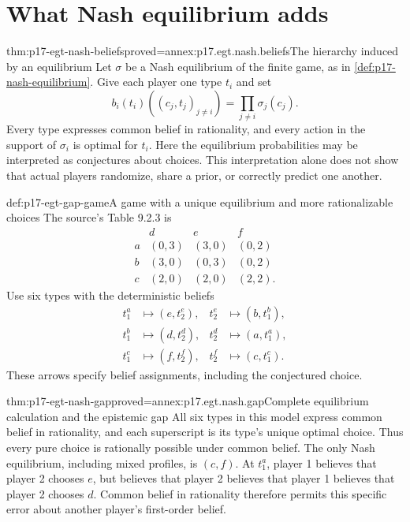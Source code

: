 \section{What Nash equilibrium adds}

\begin{hbtheorem}{thm:p17-egt-nash-beliefs}{proved=annex:p17.egt.nash.beliefs}{The hierarchy induced by an equilibrium}
Let \(\sigma\) be a Nash equilibrium of the finite game, as in
\cref{def:p17-nash-equilibrium}. Give each player one type \(t_i\)
and set
\[
 b_i(t_i)((c_j,t_j)_{j\ne i})=\prod_{j\ne i}\sigma_j(c_j).
\]
Every type expresses common belief in rationality, and every action
in the support of \(\sigma_i\) is optimal for \(t_i\).
Here the equilibrium probabilities may be interpreted as conjectures
about choices. This interpretation alone does not show that actual
players randomize, share a prior, or correctly predict one another.
\end{hbtheorem}

\begin{hbdefinition}{def:p17-egt-gap-game}{A game with a unique equilibrium and more rationalizable choices}
The source's Table 9.2.3 is
\[
 \begin{array}{c|rrr}
 &d&e&f\\\hline
 a&(0,3)&(3,0)&(0,2)\\
 b&(3,0)&(0,3)&(0,2)\\
 c&(2,0)&(2,0)&(2,2).
 \end{array}
\]
Use six types with the deterministic beliefs
\[
\begin{aligned}
 t_1^a&\mapsto(e,t_2^e),& t_2^e&\mapsto(b,t_1^b),\\
 t_1^b&\mapsto(d,t_2^d),& t_2^d&\mapsto(a,t_1^a),\\
 t_1^c&\mapsto(f,t_2^f),& t_2^f&\mapsto(c,t_1^c).
\end{aligned}
\]
These arrows specify belief assignments, including the conjectured choice.
\end{hbdefinition}

\begin{hbtheorem}{thm:p17-egt-nash-gap}{proved=annex:p17.egt.nash.gap}{Complete equilibrium calculation and the epistemic gap}
All six types in this model express common belief in rationality,
and each superscript is its type's unique optimal choice.
Thus every pure choice is rationally possible under common belief.
The only Nash equilibrium, including mixed profiles, is \((c,f)\).
At \(t_1^a\), player 1 believes that player 2 chooses \(e\), but
believes that player 2 believes that player 1 believes that player 2
chooses \(d\). Common belief in rationality therefore permits this
specific error about another player's first-order belief.
\end{hbtheorem}

